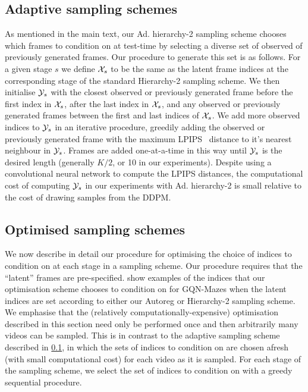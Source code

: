 \subsection{Adaptive sampling schemes} \label{ap:fdm-adaptive}
As mentioned in the main text, our Ad. hierarchy-2 sampling scheme chooses which frames to condition on at test-time by selecting a diverse set of observed of previously generated frames. Our procedure to generate this set is as follows. For a given stage $s$ we define $\mathcal{X}_s$ to be the same as the latent frame indices at the corresponding stage of the standard Hierarchy-2 sampling scheme. We then initialise $\mathcal{Y}_s$ with the closest observed or previously generated frame before the first index in $\mathcal{X}_s$, after the last index in $\mathcal{X}_s$, and any observed or previously generated frames between the first and last indices of $\mathcal{X}_s$. We add more observed indices to $\mathcal{Y}_s$ in an iterative procedure, greedily adding the observed or previously generated frame with the maximum LPIPS~\cite{zhang2018unreasonable} distance to it's nearest neighbour in $\mathcal{Y}_s$. Frames are added one-at-a-time in this way until $\mathcal{Y}_s$ is the desired length (generally $K/2$, or 10 in our experiments). Despite using a convolutional neural network to compute the LPIPS distances, the computational cost of computing $\mathcal{Y}_s$ in our experiments with Ad. hierarchy-2 is small relative to the cost of drawing samples from the DDPM.


\subsection{Optimised sampling schemes}
We now describe in detail our procedure for optimising the choice of indices to condition on at each stage in a sampling scheme. Our procedure requires that the ``latent'' frames are pre-specified.  show examples of the indices that our optimisation scheme chooses to condition on for GQN-Mazes when the latent indices are set according to either our Autoreg or Hierarchy-2 sampling scheme. We emphasise that the (relatively computationally-expensive) optimisation described in this section need only be performed once and then arbitrarily many videos can be sampled. This is in contrast to the adaptive sampling scheme described in \cref{ap:fdm-adaptive}, in which the sets of indices to condition on are chosen afresh (with small computational cost) for each video as it is sampled. For each stage of the sampling scheme, we select the set of indices to condition on with a greedy sequential procedure. 

